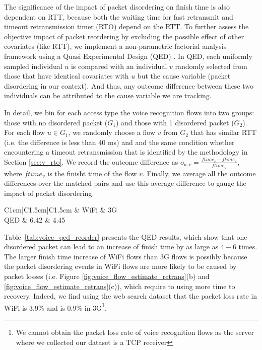 The significance of the impact of packet disordering on finish time is also dependent on RTT, because both the waiting time for fast retransmit and timeout retransmission timer (\ie RTO) depend on the RTT. To further assess the objective impact of packet reordering by excluding the possible effect of other covariates (like RTT), we implement a non-parametric factorial analysis framework using a Quasi Experimental Design (QED) \cite{krishnan2013video}. In QED, each uniformly sampled individual $u$ is compared with an individual $v$ randomly selected from those that have identical covariates with $u$ but the cause variable (packet disordering in our context). And thus, any outcome difference between these two individuals can be attributed to the cause variable we are tracking. 

In detail, we bin for each access type the voice recognition flows into two groups: those with no disordered packet ($G_1$) and those with 1 disordered packet ($G_2$). For each flow $u \in G_1$, we randomly choose a flow $v$ from $G_2$ that has similar RTT (i.e. the difference is less than 40 ms) and and the same condition whether encountering a timeout retransmission that is identified by the methodology in Section \ref{sec:v_rto}. We record the outcome difference as $o_{u,v} = \frac{ftime_{v} - ftime_{u}}{ftime_{u}}$, where $ftime_v$ is the finisht time of the flow $v$. Finally, we average all the outcome differences over the matched pairs and use this average difference to gauge the impact of packet disordering.

\begin{table}[th]
\caption{QED results for the impact of packet disordering.}
\label{tab:voice_qed_reorder}
\centering
\renewcommand{\arraystretch}{1}
\begin{tabular}{C{1cm}|C{1.5cm}|C{1.5cm}}
	\hline
	 & WiFi & 3G \\
	\hline
	QED & 6.42 & 4.45 \\
	\hline
\end{tabular}
\end{table}

Table~\ref{tab:voice_qed_reorder} presents the QED results, which show that one disordered packet can lead to an increase of finish time by as large as $4-6$ times. The larger finish time increase of WiFi flows than 3G flows is possibly because the packet disordering events in WiFi flows are more likely to be caused by packet losses (i.e. Figure \ref{fig:voice_flow_estimate_retrans}(b) and \ref{fig:voice_flow_estimate_retrans}(c)), which require to using more time to recovery. Indeed, we find using the web search dataset that the packet loss rate in WiFi is 3.9\% and is 0.9\% in 3G\footnote{We cannot obtain the packet loss rate of voice recognition flows as the server where we collected our dataset is a TCP receiver}. 

